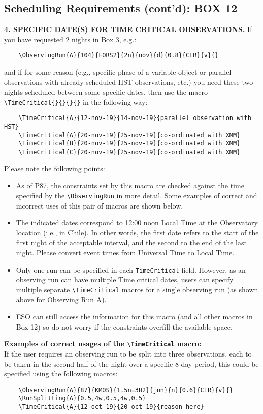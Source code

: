 \documentclass{article}
\begin{document}
\subsection{Scheduling Requirements (cont’d): {\bf BOX 12}}
\label{sec:timecrit}

{\bf 4. SPECIFIC DATE(S) FOR TIME CRITICAL OBSERVATIONS.} If you have
requested 2 nights in Box 3, e.g.:
\begin{verbatim}
    \ObservingRun{A}{104}{FORS2}{2n}{nov}{d}{0.8}{CLR}{v}{} 
\end{verbatim}
and if for some reason (e.g., specific phase of a variable object
or parallel observations with already scheduled HST observations,
etc.) you need these two nights scheduled between some specific
dates, then use the macro \verb|\TimeCritical{}{}{}{}| in the
following way:
\begin{verbatim}
    \TimeCritical{A}{12-nov-19}{14-nov-19}{parallel observation with HST}
    \TimeCritical{A}{20-nov-19}{25-nov-19}{co-ordinated with XMM}     
    \TimeCritical{B}{20-nov-19}{25-nov-19}{co-ordinated with XMM}
    \TimeCritical{C}{20-nov-19}{25-nov-19}{co-ordinated with XMM}
\end{verbatim}

Please note the following points:
\begin{itemize}
\item As of P87, the constraints set by this macro are checked against the
  time specified by the \verb|\ObservingRun| in more detail.
  Some examples of correct and incorrect uses of this pair of macros are shown below.
\item The indicated dates correspond to 12:00 noon Local Time at
  the Observatory location (i.e., in Chile). In other words, the first
  date refers to the start of the first night of the acceptable
  interval, and the second to the end of the last night. Please 
  convert event times from Universal Time to Local Time.
\item Only one run can be specified in each \verb|TimeCritical| field. 
  However, as an observing run can have multiple Time critical dates, users
  can specify multiple separate \verb|\TimeCritical| macros for a single observing run (as   
  shown above for Observing Run A).
\item ESO can still access the information for this macro (and all other macros in Box 12)   
  so do not worry if the constraints overfill the available space.
\end{itemize}

{\bf Examples of correct usages of the \verb|\TimeCritical| macro: }\\
If the user requires an observing run to be split into three observations, each to be taken in the 
second half of the night over a specific 8-day period, this could be specified using the following macros:
\begin{verbatim}
    \ObservingRun{A}{87}{KMOS}{1.5n=3H2}{jun}{n}{0.6}{CLR}{v}{}
    \RunSplitting{A}{0.5,4w,0.5,4w,0.5}
    \TimeCritical{A}{12-oct-19}{20-oct-19}{reason here}
\end{verbatim}
\end{document}
